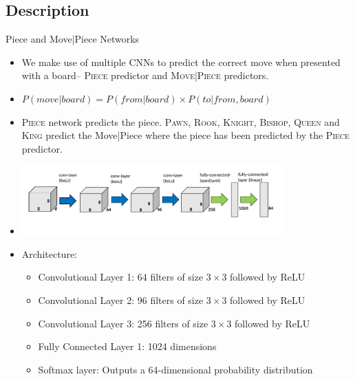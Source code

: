 \documentclass[9pt, unknownkeysallowed]{beamer}
\begin{document}
\subsection{Description}
\begin{frame}{Piece and Move|Piece Networks}
 \begin{itemize}
  \item We make use of multiple CNNs to predict the 
correct move when presented with a board-- \textsc{Piece} predictor and 
\textsc{Move|Piece} predictors.
  \item $P(move | board) = P(from|board)\times P(to|from, board)$
  \item \textsc{Piece} network predicts the piece. \textsc{Pawn}, 
\textsc{Rook}, \textsc{Knight}, \textsc{Bishop}, \textsc{Queen} and 
\textsc{King} predict the Move|Piece where the piece has been predicted by the 
\textsc{Piece} predictor.
  \item[] \includegraphics[width=0.8\textwidth,center]{../img/net1.png}
  \item Architecture:
  \begin{itemize}
   \item Convolutional Layer 1: 64 filters of size $3\times 3$ followed by ReLU
    \item Convolutional Layer 2: 96 filters of size $3\times 3$ followed by ReLU
    \item Convolutional Layer 3: 256 filters of size $3\times 3$ followed by 
ReLU
    \item Fully Connected Layer 1: 1024 dimensions
    \item Softmax layer: Outputs a 64-dimensional probability distribution
  \end{itemize}

 \end{itemize}

\end{frame}
\end{document}
